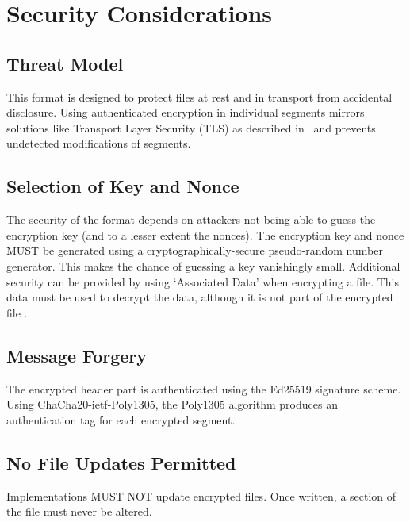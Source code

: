 \section{Security Considerations}
\subsection{Threat Model}
This format is designed to protect files at rest and in transport from
accidental disclosure.
%
Using authenticated encryption in individual segments mirrors
solutions like Transport Layer Security (TLS) as described
in~\cite{RFC5246} and prevents undetected modifications of segments.

\subsection{Selection of Key and Nonce}
The security of the format depends on attackers not being able to
guess the encryption key (and to a lesser extent the nonces).
%
The encryption key and nonce MUST be generated using a
cryptographically-secure pseudo-random number generator.
%
This makes the chance of guessing a key vanishingly small.
%
Additional security can be provided by using `Associated Data' when
encrypting a file.
%
This data must be used to decrypt the data, although it is not part of
the encrypted file \cite{RFC8439}.

\subsection{Message Forgery}
The encrypted header part is authenticated using the Ed25519 signature
scheme.
%
Using ChaCha20-ietf-Poly1305, the Poly1305 algorithm produces an
authentication tag for each encrypted segment.

\subsection{No File Updates Permitted}
Implementations MUST NOT update encrypted files.
%
Once written, a section of the file must never be altered.

